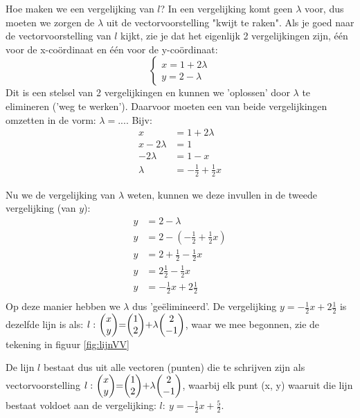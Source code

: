 Hoe maken we een vergelijking van  $ l $? In een vergelijking komt geen $ \lambda $ voor, dus moeten we zorgen de $ \lambda $ uit de vectorvoorstelling "kwijt te raken". Als je goed naar de vectorvoorstelling van $ l $ kijkt, zie je dat het eigenlijk 2 vergelijkingen zijn, één voor de x-coördinaat en één voor de y-coördinaat:
\[\begin{cases}
x = 1 + 2\lambda\\
y = 2 - \lambda 
\end{cases}
\] 
Dit is een stelsel van 2 vergelijkingen  en kunnen we 'oplossen' door $ \lambda $ te elimineren ('weg te werken'). Daarvoor moeten een van beide vergelijkingen omzetten in de vorm: $\lambda = ...$. Bijv:
\begin{align*}
  x & = 1 + 2\lambda \\
  x - 2\lambda &= 1 \\
  -2\lambda &= 1 - x \\
  \lambda &= -\frac{1}{2} + \frac{1}{2}x
\end{align*}

\newpage
Nu we de vergelijking van $\lambda$ weten, kunnen we deze invullen in de tweede vergelijking (van $y$):
\begin{align*}
  y &= 2 - \lambda \\
  y &= 2 - (-\frac{1}{2} + \frac{1}{2}x) \\
  y &= 2 + \frac{1}{2} - \frac{1}{2}x \\
  y &= 2\frac{1}{2} - \frac{1}{2}x \\
  y &= -\frac{1}{2}x + 2\frac{1}{2} \\
\end{align*}
Op deze manier hebben we $\lambda$ dus 'geëlimineerd'. De vergelijking  $ y = -\frac{1}{2}x + 2\frac{1}{2} $  is dezelfde lijn is als: $ l: \ \vectwee {x}{y} = \vectwee {1}{2} + \lambda  \vectwee {2}{-1}  $, waar we mee begonnen, zie de tekening in  figuur  \ref{fig:lijnVV}


De lijn $l$ bestaat dus uit alle vectoren (punten) die te schrijven zijn als vectorvoorstelling $ l: \ \vectwee {x}{y} = \vectwee {1}{2} + \lambda  \vectwee {2}{-1}  $, waarbij elk punt (x, y) waaruit die lijn bestaat voldoet aan de vergelijking: $ l:  \ y = - \frac{1}{2}x + \frac{5}{2} $.

